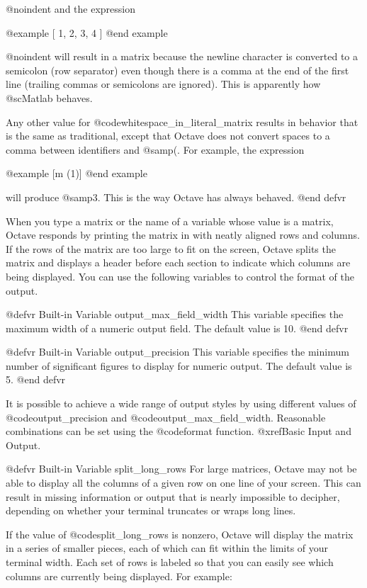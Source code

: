@noindent
and the expression

@example
[ 1, 2,
  3, 4 ]
@end example

@noindent
will result in a matrix because the newline character is converted to a
semicolon (row separator) even though there is a comma at the end of the
first line (trailing commas or semicolons are ignored).  This is
apparently how @sc{Matlab} behaves.

Any other value for @code{whitespace_in_literal_matrix} results in behavior
that is the same as traditional, except that Octave does not
convert spaces to a comma between identifiers and @samp{(}.  For
example, the expression

@example
[m (1)]
@end example

will produce @samp{3}.  This is the way Octave has always behaved.
@end defvr

When you type a matrix or the name of a variable whose value is a
matrix, Octave responds by printing the matrix in with neatly aligned
rows and columns.  If the rows of the matrix are too large to fit on the
screen, Octave splits the matrix and displays a header before each
section to indicate which columns are being displayed.  You can use the
following variables to control the format of the output.

@defvr {Built-in Variable} output_max_field_width
This variable specifies the maximum width of a numeric output field.
The default value is 10.
@end defvr

@defvr {Built-in Variable} output_precision
This variable specifies the minimum number of significant figures to
display for numeric output.  The default value is 5.
@end defvr

It is possible to achieve a wide range of output styles by using
different values of @code{output_precision} and
@code{output_max_field_width}.  Reasonable combinations can be set using
the @code{format} function.  @xref{Basic Input and Output}.

@defvr {Built-in Variable} split_long_rows
For large matrices, Octave may not be able to display all the columns of
a given row on one line of your screen.  This can result in missing
information or output that is nearly impossible to decipher, depending
on whether your terminal truncates or wraps long lines.

If the value of @code{split_long_rows} is nonzero, Octave will display
the matrix in a series of smaller pieces, each of which can fit within
the limits of your terminal width.  Each set of rows is labeled so that
you can easily see which columns are currently being displayed.
For example:

